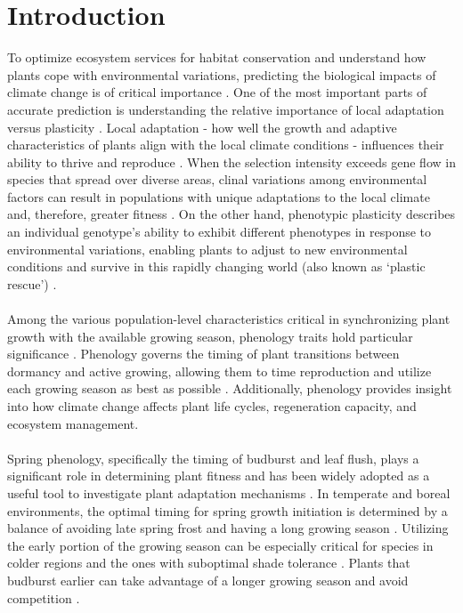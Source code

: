 \documentclass{article}
\begin{document}
\section{Introduction}
To optimize ecosystem services for habitat conservation and understand how plants cope with environmental variations, predicting the biological impacts of climate change is of critical importance \citep{botero15}. One of the most important parts of accurate prediction is understanding the relative importance of local adaptation versus plasticity \citep{chevin10}. Local adaptation - how well the growth and adaptive characteristics of plants align with the local climate conditions - influences their ability to thrive and reproduce  \citep{casmey22, kawecki04, anderson12, kim13}. When the selection intensity exceeds gene flow in species that spread over diverse areas, clinal variations among environmental factors can result in populations with unique adaptations to the local climate and, therefore, greater fitness \citep{kremer12, rossi15, salmela13}. On the other hand, phenotypic plasticity describes an individual genotype’s ability to exhibit different phenotypes in response to environmental variations, enabling plants to adjust to new environmental conditions and survive in this rapidly changing world (also known as ‘plastic rescue’)  \citep{chevin10, chevin102, snell18}. \\
\\
Among the various population-level characteristics critical in synchronizing plant growth with the available growing season, phenology traits hold particular significance \citep{primack80, oneil97, chuine01}. Phenology governs the timing of plant transitions between dormancy and active growing, allowing them to time reproduction and utilize each growing season as best as possible \citep{chuine10, hanninen11}. Additionally, phenology provides insight into how climate change affects plant life cycles, regeneration capacity, and ecosystem management.\\
\\
Spring phenology, specifically the timing of budburst and leaf flush, plays a significant role in determining plant fitness and has been widely adopted as a useful tool to investigate plant adaptation mechanisms \citep{guo22, chuine01}. In temperate and boreal environments, the optimal timing for spring growth initiation is determined by a balance of avoiding late spring frost and having a long growing season \citep{alberto11, lenz16, allevato19}. Utilizing the early portion of the growing season can be especially critical for species in colder regions \citep{morin07, dantec15} and the ones with suboptimal shade tolerance \citep{richardson09}. Plants that budburst earlier can take advantage of a longer growing season and avoid competition  \citep{guo22}. \\
\end{document}
